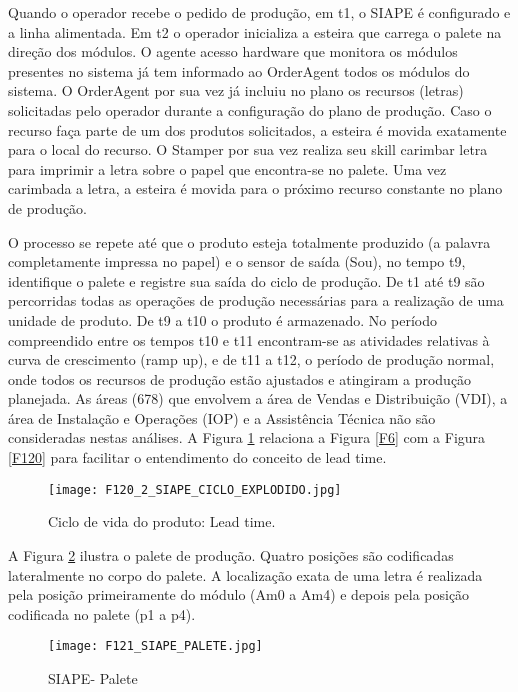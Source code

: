 Quando o operador recebe o pedido de produção, em t1, o SIAPE é configurado e a linha alimentada. Em t2 o operador inicializa a esteira que carrega o palete na direção dos módulos. O agente acesso hardware que monitora os módulos presentes no sistema já tem informado ao OrderAgent todos os módulos do sistema. O OrderAgent por sua vez já incluiu no plano os recursos (letras) solicitadas pelo operador durante a configuração do plano de produção. Caso o recurso faça parte de um dos produtos solicitados, a esteira é movida exatamente para o local do recurso. O Stamper por sua vez realiza seu skill carimbar letra para imprimir a letra sobre o papel que encontra-se no palete. Uma vez carimbada a letra, a esteira é movida para o próximo recurso constante no plano de produção.\par 
O processo se repete até que o produto esteja totalmente produzido (a palavra completamente impressa no papel)  e o sensor de saída (Sou), no tempo t9,  identifique o palete e registre sua saída do ciclo de produção. De t1 até t9 são percorridas todas as operações de produção necessárias para a realização de uma unidade de produto. De t9 a t10 o produto é armazenado. No período compreendido entre os tempos t10 e t11 encontram-se as atividades relativas à curva de crescimento (ramp up), e de t11 a t12, o período de produção normal, onde todos os recursos de produção estão ajustados e atingiram a produção planejada. As áreas (678) que envolvem a área de Vendas e Distribuição (VDI), a área de Instalação e Operações (IOP) e a Assistência Técnica não são consideradas nestas análises. A Figura   \ref{F120_2} relaciona a Figura \ref{F6} com a Figura \ref{F120} para facilitar o entendimento do conceito de lead time.
	
		
		\begin{figure}[h]
			\centering
			\texttt{[image: F120\_2\_SIAPE\_CICLO\_EXPLODIDO.jpg]} 
			\caption{Ciclo de vida do produto: Lead time.}
			\label{F120_2}
		\end{figure}
	
A Figura \ref{F121} ilustra o palete de produção. Quatro posições são codificadas lateralmente no corpo do palete. A localização exata de uma letra é realizada pela posição primeiramente do módulo (Am0 a Am4) e depois pela posição codificada no palete (p1 a p4).
	
		\begin{figure}[h]
			\centering
			\texttt{[image: F121\_SIAPE\_PALETE.jpg]} 
			\caption{SIAPE- Palete}
			\label{F121}
		\end{figure}
		
